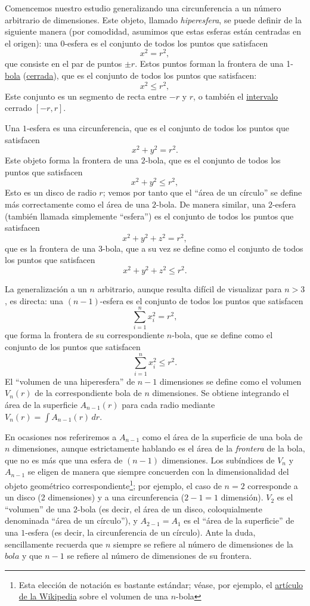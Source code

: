 Comencemos nuestro estudio generalizando una circunferencia a un número arbitrario de dimensiones. Este objeto, llamado \emph{hiperesfera}, se puede definir de la siguiente manera (por comodidad, asumimos que estas esferas están centradas en el origen): una $0$-esfera es el conjunto de todos los puntos que satisfacen
\[
x^2 = r^2,
\]
que consiste en el par de puntos $\pm r$. Estos puntos forman la frontera de una 1-\href{https://es.wikipedia.org/wiki/Bola_(matem%C3%A1tica)}{bola} (\href{https://es.wikipedia.org/wiki/Conjunto_cerrado}{cerrada}), que es el conjunto de todos los puntos que satisfacen:
\[
x^2 \leq r^2,
\]
Este conjunto es un segmento de recta entre $-r$ y $r$, o también el \href{https://es.wikipedia.org/wiki/Intervalo_(matem%C3%A1tica)}{intervalo} cerrado $[-r, r]$. 

Una $1$-esfera es una circunferencia, que es el conjunto de todos los puntos que satisfacen
\[
x^2 + y^2 = r^2.
\]
Este objeto forma la frontera de una $2$-bola, que es el conjunto de todos los puntos que satisfacen
\[
x^2 + y^2 \leq r^2,
\]
Esto es un disco de radio $r$; vemos por tanto que el ``área de un círculo'' se define más correctamente como el área de una $2$-bola. De manera similar, una $2$-esfera (también llamada simplemente ``esfera'') es el conjunto de todos los puntos que satisfacen
\[
x^2 + y^2 + z^2 = r^2,
\]
que es la frontera de una $3$-bola, que a su vez se define como el conjunto de todos los puntos que satisfacen
\[
x^2 + y^2 + z^2 \leq r^2.
\]

La generalización a un $n$ arbitrario, aunque resulta difícil de visualizar para $n > 3$, es directa: una $(n-1)$-esfera es el conjunto de todos los puntos que satisfacen
\[
\sum_{i=1}^{n} x_i^2 = r^2,
\]
que forma la frontera de su correspondiente $n$-bola, que se define como el conjunto de los puntos que satisfacen
\[
\sum_{i=1}^{n} x_i^2 \leq r^2.
\]
El ``volumen de una hiperesfera'' de $n-1$ dimensiones se define como el volumen $V_n(r)$ de la correspondiente bola de $n$ dimensiones. Se obtiene integrando el área de la superficie $A_{n-1}(r)$ para cada radio mediante $V_n(r) = \int A_{n-1}(r)\,dr$.

En ocasiones nos referiremos a $A_{n-1}$ como el área de la superficie de una bola de $n$ dimensiones, aunque estrictamente hablando es el área de la \emph{frontera} de la bola, que no es más que una esfera de $(n-1)$ dimensiones. Los subíndices de $V_n$ y $A_{n-1}$ se eligen de manera que siempre concuerden con la dimensionalidad del objeto geométrico correspondiente\footnote{Esta elección de notación es bastante estándar; véase, por ejemplo, el \href{https://es.wikipedia.org/wiki/Volumen_de_una_n-bola}{artículo de la Wikipedia} sobre el volumen de una $n$-bola}; por ejemplo, el caso de $n=2$ corresponde a un disco (2 dimensiones) y a una circunferencia ($2-1 = 1$ dimensión). $V_2$ es el ``volumen'' de una $2$-bola (es decir, el área de un disco, coloquialmente denominada ``área de un círculo''), y $A_{2-1} = A_1$ es el ``área de la superficie'' de una $1$-esfera (es decir, la circunferencia de un círculo). Ante la duda, sencillamente recuerda que $n$ siempre se refiere al número de dimensiones de la $bola$ y que $n-1$ se refiere al número de dimensiones de su frontera. 


